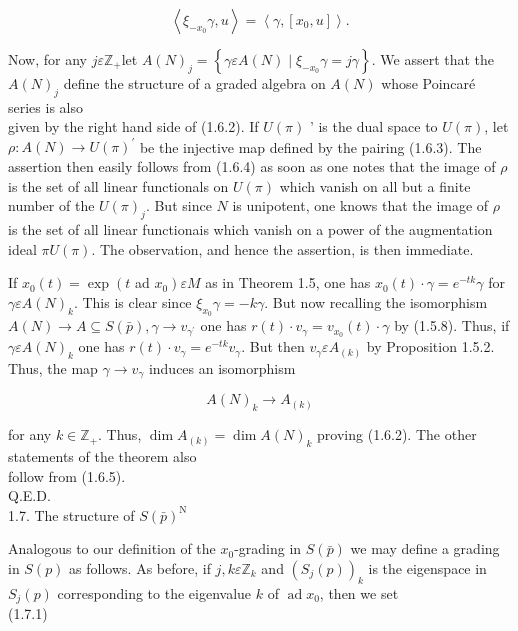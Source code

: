 \documentclass[10pt]{article}
\begin{document}
\begin{equation*}
\left\langle\xi_{-x_{0}} \gamma, u\right\rangle=\left\langle\gamma,\left[x_{0}, u\right]\right\rangle . \tag{1.6.4}
\end{equation*}


Now, for any $j \varepsilon \mathbb{Z}_{+}$let $A(N)_{j}=\left\{\gamma \varepsilon A(N) \mid \xi_{-x_{0}} \gamma=j \gamma\right\}$. We assert that the $A(N)_{j}$ define the structure of a graded algebra on $A(N)$ whose Poincaré series is also\\
given by the right hand side of (1.6.2). If $U(\pi)$ ' is the dual space to $U(\pi)$, let $\rho: A(N) \rightarrow U(\pi)^{\prime}$ be the injective map defined by the pairing (1.6.3). The assertion then easily follows from (1.6.4) as soon as one notes that the image of $\rho$ is the set of all linear functionals on $U(\pi)$ which vanish on all but a finite number of the $U(\pi)_{j}$. But since $N$ is unipotent, one knows that the image of $\rho$ is the set of all linear functionais which vanish on a power of the augmentation ideal $\pi U(\pi)$. The observation, and hence the assertion, is then immediate.

If $x_{0}(t)=\exp \left(t\right.$ ad $\left.x_{0}\right) \varepsilon M$ as in Theorem 1.5, one has $x_{0}(t) \cdot \gamma=e^{-t k} \gamma$ for $\gamma \varepsilon A(N)_{k}$. This is clear since $\xi_{x_{0}} \gamma=-k \gamma$. But now recalling the isomorphism $A(N) \rightarrow A \subseteq S(\bar{p}), \gamma \rightarrow v_{\gamma^{\prime}}$ one has $r(t) \cdot v_{\gamma}=v_{x_{0}}(t) \cdot \gamma$ by (1.5.8). Thus, if $\gamma \varepsilon A(N)_{k}$ one has $r(t) \cdot v_{\gamma}=e^{-t k} v_{\gamma}$. But then $v_{\gamma} \varepsilon A_{(k)}$ by Proposition 1.5.2. Thus, the map $\gamma \rightarrow v_{\gamma}$ induces an isomorphism


\begin{equation*}
A(N)_{k} \rightarrow A_{(k)} \tag{1.6.5}
\end{equation*}


for any $k \in \mathbb{Z}_{+}$. Thus, $\operatorname{dim} A_{(k)}=\operatorname{dim} A(N)_{k}$ proving (1.6.2). The other statements of the theorem also\\
follow from (1.6.5).\\
Q.E.D.\\
1.7. The structure of $S(\bar{p})^{\mathrm{N}}$

Analogous to our definition of the $x_{0}$-grading in $S(\bar{p})$ we may define a grading in $S(p)$ as follows. As before, if $j, k \varepsilon \mathbb{Z}_{k}$ and $\left(S_{j}(p)\right)_{k}$ is the eigenspace in $S_{j}(p)$ corresponding to the eigenvalue $k$ of $\operatorname{ad} x_{0}$, then we set\\
(1.7.1)
\end{document}
